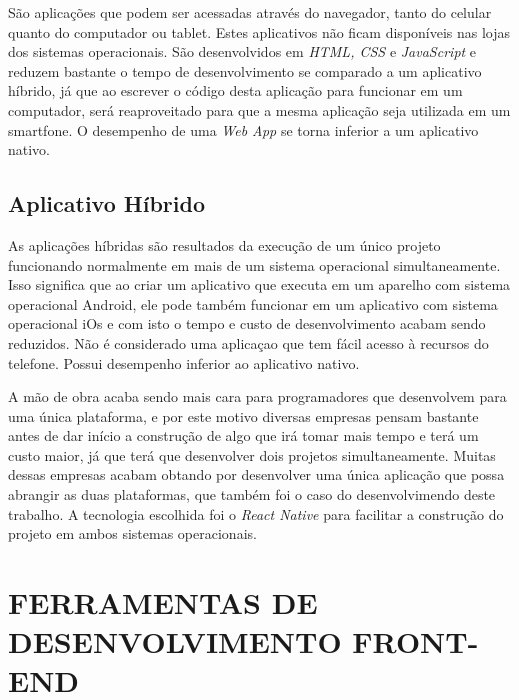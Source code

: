 São aplicações que podem ser acessadas através do navegador, tanto do celular quanto do computador ou tablet. Estes aplicativos não ficam disponíveis nas lojas dos sistemas operacionais. São desenvolvidos em \textit{HTML, CSS} e \textit{JavaScript} e reduzem bastante o tempo de desenvolvimento se comparado a um aplicativo híbrido, já que ao escrever o código desta aplicação para funcionar em um computador, será reaproveitado para que a mesma aplicação seja utilizada em um smartfone. O desempenho de uma \textit{Web App} se torna inferior a um aplicativo nativo.


\subsection{Aplicativo Híbrido}
As aplicações híbridas são resultados da execução de um único projeto funcionando normalmente em mais de um sistema operacional simultaneamente. Isso significa que ao criar um aplicativo que executa em um aparelho com sistema operacional Android, ele pode também funcionar em um aplicativo com sistema operacional iOs e com isto o tempo e custo de desenvolvimento acabam sendo reduzidos. Não é considerado uma aplicaçao que tem fácil acesso à recursos do telefone. Possui desempenho inferior ao aplicativo nativo.

A mão de obra acaba sendo mais cara para programadores que desenvolvem para uma única plataforma, e por este motivo diversas empresas pensam bastante antes de dar início a construção de algo que irá tomar mais tempo e terá um custo maior, já que terá que desenvolver dois projetos simultaneamente. Muitas dessas empresas acabam obtando por desenvolver uma única aplicação que possa abrangir as duas plataformas, que também foi o caso do desenvolvimendo deste trabalho. A tecnologia escolhida foi o \textit{React Native} para facilitar a construção do projeto em ambos sistemas operacionais. 




\section{FERRAMENTAS DE DESENVOLVIMENTO FRONT-END}

